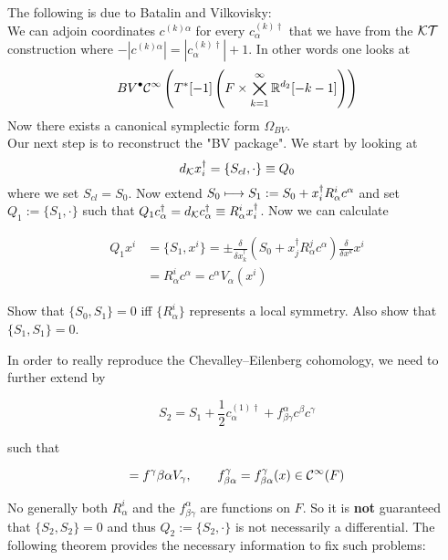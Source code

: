 The following is due to Batalin and Vilkovisky:\\
We can adjoin coordinates $c^{(k)\alpha}$ for every $c^{(k)\dagger}_\alpha$ that we have from the ${\mathcal{KT}}$ construction where $-|c^{(k)\alpha}| = |c^{(k)\dagger}_\alpha| + 1$. In other words one looks at
\begin{equation}
  BV^\bullet \mathcal{C}^{\infty}\left(T^*[-1]\left(F \times \bigtimes_{k = 1}^\infty \mathbb{R}^{d_2}[-k-1]\right)\right)
\end{equation}
Now there exists a canonical symplectic form $\Omega_{BV}$.\\

Our next step is to reconstruct the "BV package". We start by looking at
\begin{equation}
  d_{{\mathcal{K}}} x^\dagger_i = \{ S_{cl}, \cdot \} \equiv Q_0
\end{equation}
where we set $S_{cl} = S_0$. Now extend $S_0 \longmapsto S_1 := S_0 + x^\dagger_i R^i_\alpha c^\alpha$ and set $Q_1 := \{ S_1, \cdot \}$ such that $Q_1 c^\dagger_\alpha = d_{{\mathcal{K}}} c^\dagger_\alpha \equiv R^i_\alpha x^\dagger_i$. Now we can calculate

\begin{align}
  Q_1 x^i &= \{ S_1, x^i \} = \pm \frac{\delta}{\delta x^\dagger_k} ( S_0 + x^\dagger_j R^j_\alpha c^\alpha) \frac{\delta}{\delta x^k} x^i \\
  &= R^i_\alpha c^\alpha = c^\alpha V_\alpha(x^i)
\end{align}

\begin{ex}
  Show that $\{S_0, S_1\} = 0$ iff $\{R^i_\alpha\}$ represents a local symmetry. Also show that $\{S_1, S_1\} = 0$.
\end{ex}

In order to really reproduce the Chevalley--Eilenberg cohomology, we need to further extend by

\begin{equation}
  S_2 = S_1 + \frac{1}{2} c^{(1)\dagger}_\alpha + f^\alpha_{\beta\gamma} c^\beta c^\gamma
\end{equation}

such that

\begin{equation}
  [V_\beta, V_\alpha] = f^\gamma{\beta\alpha} V_\gamma, \quad \quad f^\gamma_{\beta\alpha} = f^\gamma_{\beta\alpha} (x) \in \Ci(F)
\end{equation}

No generally both $R^i_\alpha$ and the $f^\alpha_{\beta\gamma}$ are functions on $F$. So it is \textbf{not} guaranteed that $\{S_2, S_2\} = 0$ and thus $Q_2 := \{S_2, \cdot\}$ is not necessarily a differential. The following theorem provides the necessary information to fix such problems:

